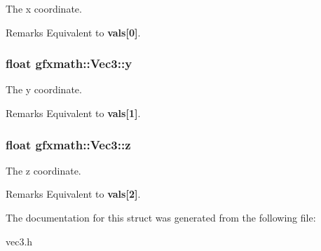 The x coordinate. 

\begin{DoxyRemark}{Remarks}
Equivalent to {\bfseries vals\mbox{[}0\mbox{]}}. 
\end{DoxyRemark}
\hypertarget{structgfxmath_1_1_vec3_a398bee406395fdc1ad381f5b70d7fd99}{}
\subsubsection[{y}]{\setlength{\rightskip}{0pt plus 5cm}float gfxmath\+::\+Vec3\+::y}\label{structgfxmath_1_1_vec3_a398bee406395fdc1ad381f5b70d7fd99}


The y coordinate. 

\begin{DoxyRemark}{Remarks}
Equivalent to {\bfseries vals\mbox{[}1\mbox{]}}. 
\end{DoxyRemark}
\hypertarget{structgfxmath_1_1_vec3_a93c1920712889d4f10520c7dc76a79c7}{}
\subsubsection[{z}]{\setlength{\rightskip}{0pt plus 5cm}float gfxmath\+::\+Vec3\+::z}\label{structgfxmath_1_1_vec3_a93c1920712889d4f10520c7dc76a79c7}


The z coordinate. 

\begin{DoxyRemark}{Remarks}
Equivalent to {\bfseries vals\mbox{[}2\mbox{]}}. 
\end{DoxyRemark}


The documentation for this struct was generated from the following file\+:\begin{DoxyCompactItemize}
\item 
vec3.\+h\end{DoxyCompactItemize}
